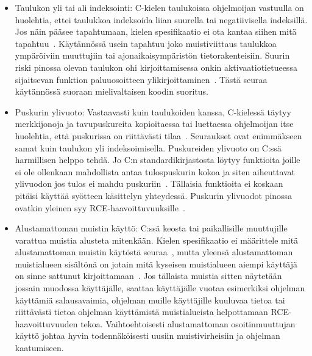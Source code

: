 \begin{itemize}
    \item Taulukon yli tai ali indeksointi: C-kielen taulukoissa ohjelmoijan vastuulla on huolehtia,
          ettei taulukkoa indeksoida liian suurella tai negatiivisella indeksillä.
          Jos näin pääsee tapahtumaan, kielen spesifikaatio ei ota kantaa siihen mitä tapahtuu~\cite[kohta 6.5.6]{CSpec}.
          Käytännössä usein tapahtuu joko muistiviittaus taulukkoa ympäröiviin muuttujiin tai
          ajonaikaisympäristön tietorakenteisiin.
          Suurin riski pinossa olevan taulukon ohi kirjoittamisessa onkin aktivaatiotietueessa
          sijaitsevan funktion paluuosoitteen ylikirjoittaminen~\cite{StaticallyDetecting,SplintLCLint}.
          Tästä seuraa käytännössä suoraan mielivaltaisen koodin suoritus.
    \item Puskurin ylivuoto: Vastaavasti kuin taulukoiden kanssa,
          C-kielessä täytyy merkkijonoja ja tavupuskureita kopioitaessa tai luettaessa
          ohjelmoijan itse huolehtia, että puskurissa on riittävästi tilaa~\cite[kohta 7.24.1]{CSpec}.
          Seuraukset ovat enimmäkseen samat kuin taulukon yli indeksoimisella.
          Puskureiden ylivuoto on C:ssä harmillisen helppo tehdä.
          Jo C:n standardikirjastosta löytyy funktioita joille ei ole ollenkaan mahdollista antaa tulospuskurin
          kokoa ja siten aiheuttavat ylivuodon jos tulos ei mahdu puskuriin~\cite{StaticallyDetecting,SplintLCLint}.
          Tällaisia funktioita ei koskaan pitäisi käyttää syötteen käsittelyn yhteydessä.
          Puskurin ylivuodot pinossa ovatkin yleinen syy RCE-haavoittuvuuksille~\cite{SplintLCLint}.
    \item Alustamattoman muistin käyttö: C:ssä keosta tai paikallisille muuttujille varattua muistia
          alusteta mitenkään.
          Kielen spesifikaatio ei määrittele mitä alustamattoman muistin käytöstä seuraa~\cite[kohdat 6.3.2.1 ja 7.22.3.4]{CSpec},
          mutta yleensä alustamattoman muistialueen sisältönä on jotain mitä kyseisen muistialueen aiempi käyttäjä on
          sinne sattunut kirjoittamaan~\cite{SecurityRootOfTheProblem}.
%
          Jos tällaista muistia sitten näytetään jossain muodossa käyttäjälle,
          saattaa käyttäjälle vuotaa esimerkiksi ohjelman käyttämiä salausavaimia,
          ohjelman muille käyttäjille kuuluvaa tietoa tai
          riittävästi tietoa ohjelman käyttämistä muistialueista helpottamaan RCE-haavoittuvuuden tekoa.
          Vaihtoehtoisesti alustamattoman osoitinmuuttujan käyttö johtaa hyvin todennäköisesti uusiin muistivirheisiin
          ja ohjelman kaatumiseen.

\end{itemize}
